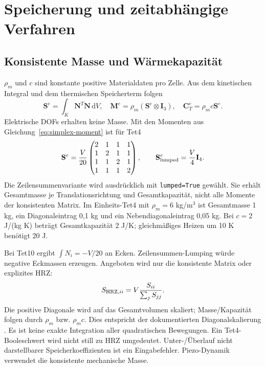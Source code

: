 \chapter{Speicherung und zeitabhängige Verfahren}\label{chap:dynamics}
\section{Konsistente Masse und Wärmekapazität}
$\rho_m$ und $c$ sind konstante positive Materialdaten pro Zelle. Aus dem
kinetischen Integral und dem thermischen Speicherterm folgen
\begin{equation}\label{eq:storage}
\mathbf S^e=\int_K\mathbf N^T\mathbf N\,\mathrm dV,\quad
\mathbf M^e=\rho_m(\mathbf S^e\otimes\mathbf I_3),\quad
\mathbf C_T^e=\rho_m c\mathbf S^e.
\end{equation}
Elektrische DOFs erhalten keine Masse. Mit den Momenten aus
Gleichung~\ref{eq:simplex-moment} ist für Tet4
\begin{equation}\label{eq:tet4-storage}
\mathbf S^e=\frac V{20}
\begin{pmatrix}2&1&1&1\\1&2&1&1\\1&1&2&1\\1&1&1&2\end{pmatrix},
\qquad\mathbf S_{\rm lumped}^e=\frac V4\mathbf I_4.
\end{equation}
Die Zeilensummenvariante wird ausdrücklich mit \texttt{lumped=True} gewählt.
Sie erhält Gesamtmasse je Translationsrichtung und Gesamtkapazität, nicht
alle Momente der konsistenten Matrix. Im Einheits-Tet4 mit $\rho_m=6$ kg/m$^3$
ist Gesamtmasse 1 kg, ein Diagonaleintrag 0,1 kg und ein Nebendiagonaleintrag
0,05 kg. Bei $c=2$ J/(kg K) beträgt Gesamtkapazität 2 J/K; gleichmäßiges
Heizen um 10 K benötigt 20 J.

Bei Tet10 ergibt $\int N_i=-V/20$ an Ecken. Zeilensummen-Lumping würde
negative Eckmassen erzeugen. Angeboten wird nur die konsistente Matrix oder
explizites HRZ:
\begin{equation}\label{eq:hrz}
S_{{\rm HRZ},ii}=V\frac{S_{ii}}{\sum_jS_{jj}}.
\end{equation}
Die positive Diagonale wird auf das Gesamtvolumen skaliert; Masse/Kapazität
folgen durch $\rho_m$ bzw. $\rho_mc$. Dies entspricht der dokumentierten
Diagonalskalierung \cite{oasys-hrz}. Es ist keine exakte Integration aller
quadratischen Bewegungen. Ein Tet4-Booleschwert wird nicht still zu HRZ
umgedeutet. Unter-/Überlauf nicht darstellbarer Speicherkoeffizienten ist ein
Eingabefehler. Piezo-Dynamik verwendet die konsistente mechanische Masse.

